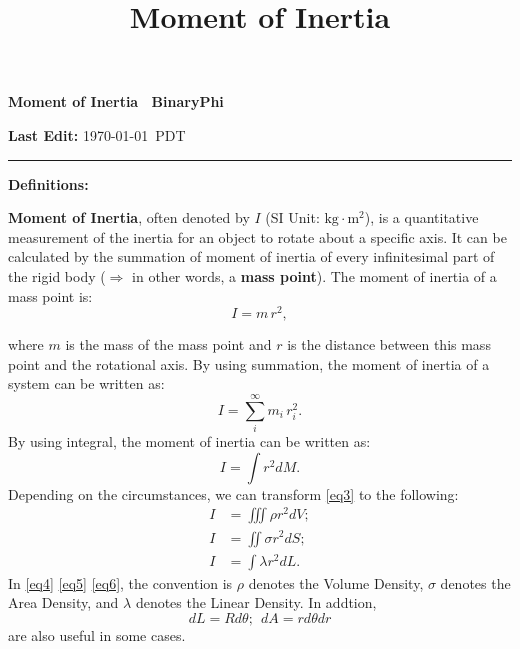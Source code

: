 \documentclass[12pt]{scrartcl}
\title{Moment of Inertia}
\begin{document}
	\begin{center}
		\textbf{ \large Moment of Inertia \raisebox{0.5\depth}{\scalebox{0.8}\textcopyright}~BinaryPhi}
	\end{center}
	\vspace{-0.3em}
	\hspace{\fill} \textbf{Last Edit:} \today~PDT \vspace{-0.6em} \\
	\hrule

\vspace{3em}

{\selectfont
	\noindent \textbf{\large Definitions:}
}
\vspace{1em}

	\noindent \textbf{Moment of Inertia}, often denoted by $I$ (SI Unit: $\text{kg}\cdot\text{m}^2$), is a quantitative measurement of the inertia for an object to rotate about a specific axis. It can be calculated by the summation of moment of inertia of every infinitesimal part of the rigid body ($\Longrightarrow$ in other words, a \textbf{mass point}). The moment of inertia of a mass point is:
	\begin{equation} \label{eq1}
	I = m \hspace{2pt} r^2,
	\end{equation}

\noindent where $m$ is the mass of the mass point and $r$ is the distance between this mass point and the rotational axis. By using summation, the moment of inertia of a system can be written as:
	\begin{equation} \label{eq2}
	I = \sum_i^{\infty} m_i \hspace{2pt} r_i^2.
	\end{equation}
\newline
\noindent By using integral, the moment of inertia can be written as:
	\begin{equation} \label{eq3}
	I = \int r^2 dM.
	\end{equation}	
\newline
\noindent Depending on the circumstances, we can transform \eqref{eq3} to the following:
	\begin{align} 
	I &= \iiint \rho r^2 dV; \label{eq4} \\
	I &= \iint \sigma r^2 dS; \label{eq5} \\
	I &= \int \lambda r^2 dL. \label{eq6}
	\end{align}
\newline
\noindent In \eqref{eq4} \eqref{eq5} \eqref{eq6}, the convention is $\rho$ denotes the Volume Density, $\sigma$ denotes the Area Density, and $\lambda$ denotes the Linear Density. In addtion, 
	$$dL = Rd\theta; ~~ dA = rd\theta dr$$
are also useful in some cases.
\end{document}
